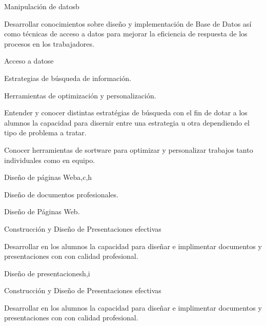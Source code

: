 \begin{syllabus}
\begin{unit}{Manipulación de datos}{}{b}
   \begin{learningoutcomes}
      \item  Desarrollar conocimientos sobre diseño y implementación de Base de Datos así como técnicas de acceso a datos para mejorar la eficiencia de respuesta de los procesos en los trabajadores.
   \end{learningoutcomes}
\end{unit}

\begin{unit}{Acceso a datos}{}{e}
   \begin{topics}
      \item Estrategias de búsqueda de información.
      \item Herramientas de optimización y personalización.
   \end{topics}

   \begin{learningoutcomes}
      \item Entender y conocer distintas estratégias de búsqueda con el fin de dotar a los alumnos la capacidad para disernir entre una estrategia  u otra dependiendo el tipo de problema a tratar.
      \item  Conocer herramientas de sortware para optimizar y personalizar trabajos tanto individuales como en equipo.
   \end{learningoutcomes}
\end{unit}

\begin{unit}{Diseño de páginas Web}{}{a,c,h}
   \begin{topics}
      \item Diseño de documentos profesionales.
      \item Diseño de Páginas Web.
      \item Construcción  y Diseño de Presentaciones  efectivas 
    \end{topics}
  \begin{learningoutcomes}
      \item Desarrollar en los alumnos la capacidad para diseñar  e implimentar documentos y presentaciones con 
       con calidad profesional.
  \end{learningoutcomes}
\end{unit}

\begin{unit}{Diseño de presentaciones}{}{h,i}
   \begin{topics}
      \item Construcción  y Diseño de Presentaciones  efectivas 
    \end{topics}
  \begin{learningoutcomes}
      \item Desarrollar en los alumnos la capacidad para diseñar  e implimentar documentos y presentaciones con 
       con calidad profesional.
  \end{learningoutcomes}
\end{unit}


\end{syllabus}
